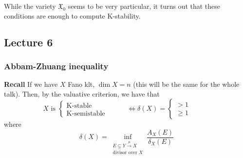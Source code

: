 \begin{remark}\leavevmode
While the variety \(\mathfrak{X}_0\) seems to be very particular, it turns out that these conditions are enough to compute K-stability.
\end{remark}

\subsection{Lecture 6}

\subsubsection{Abbam-Zhuang inequality}

\textbf{Recall} If we have \(X\) Fano klt, \(\dim X=n\) (this will be the same for the whole talk). Then, by the valuative criterion, we have that 
\[X \text{ is }\begin{cases}
	\text{K-stable} \qquad & \\
	\text{K-semistable} \qquad &
\end{cases}\iff \delta(X)=\begin{cases}
	>1\qquad & \\
	\geq 1\qquad &
\end{cases}\]
where
\[\delta(X)=\operatorname{inf}_{\substack{E \subseteq Y \xrightarrow{\mu}X \\ \text{divisor over \(X\)} }}\frac{A_X(E)}{\delta_X(E)}\]

